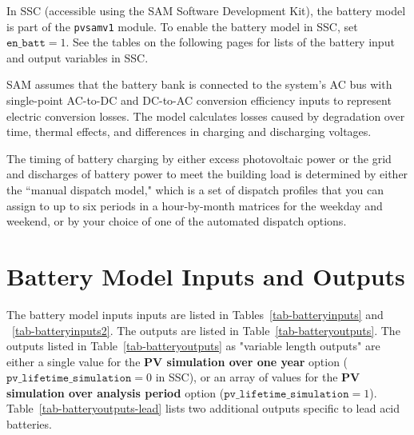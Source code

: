 \documentclass[12pt,letterpaper]{article}
\begin{document}
In SSC (accessible using the SAM Software Development Kit), the battery model is part of the \texttt{pvsamv1} module. To enable the battery model in SSC, set $\texttt{en\_batt}=1$. See the tables on the following pages for lists of the battery input and output variables in SSC.

SAM assumes that the battery bank is connected to the system's AC bus with single-point AC-to-DC and DC-to-AC conversion efficiency inputs to represent electric conversion losses. The model calculates losses caused by degradation over time, thermal effects, and differences in charging and discharging voltages.

The timing of battery charging by either excess photovoltaic power or the grid and discharges of battery power to meet the building load is determined by either the ``manual dispatch model," which is a set of dispatch profiles that you can assign to up to six periods in a hour-by-month matrices for the weekday and weekend, or by your choice of one of the automated dispatch options. 

\section{Battery Model Inputs and Outputs}\label{sec-batterymodel-inputs}
The battery model inputs inputs are listed in Tables~\ref{tab-batteryinputs} and ~\ref{tab-batteryinputs2}. The outputs are listed in Table~\ref{tab-batteryoutputs}. The outputs listed in Table~\ref{tab-batteryoutputs} as "variable length outputs" are either a single value for the \textbf{PV simulation over one year} option ($\texttt{pv\_lifetime\_simulation}=0$ in SSC), or an array of values for the \textbf{PV simulation over analysis period} option ($\texttt{pv\_lifetime\_simulation}=1$). Table~\ref{tab-batteryoutputs-lead} lists two additional outputs specific to lead acid batteries.  
\end{document}
